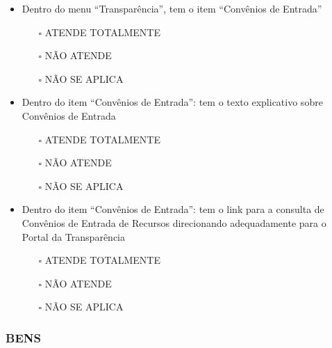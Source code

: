 \documentclass[
]{book}
\providecommand{\tightlist}{%
  \setlength{\itemsep}{0pt}\setlength{\parskip}{0pt}}
\begin{document}
\begin{itemize}
\tightlist
\item
  Dentro do menu ``Transparência'', tem o item ``Convênios de Entrada''

  \begin{itemize}
  \tightlist
  \item[$\square$]
    ATENDE TOTALMENTE
  \item[$\square$]
    NÃO ATENDE
  \item[$\square$]
    NÃO SE APLICA
  \end{itemize}
\item
  Dentro do item ``Convênios de Entrada'': tem o texto explicativo sobre Convênios de Entrada

  \begin{itemize}
  \tightlist
  \item[$\square$]
    ATENDE TOTALMENTE
  \item[$\square$]
    NÃO ATENDE
  \item[$\square$]
    NÃO SE APLICA
  \end{itemize}
\item
  Dentro do item ``Convênios de Entrada'': tem o link para a consulta de Convênios de Entrada de Recursos direcionando adequadamente para o Portal da Transparência

  \begin{itemize}
  \tightlist
  \item[$\square$]
    ATENDE TOTALMENTE
  \item[$\square$]
    NÃO ATENDE
  \item[$\square$]
    NÃO SE APLICA
  \end{itemize}
\end{itemize}

\hypertarget{bens-1}{%
\subsubsection*{BENS}\label{bens-1}}
\end{document}
